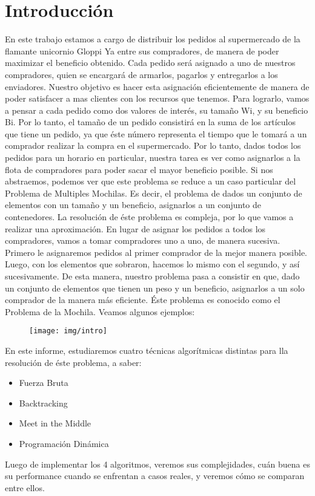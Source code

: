\section{Introducción}
En este trabajo estamos a cargo de distribuir los pedidos al supermercado de la flamante unicornio Gloppi Ya entre sus compradores, de manera de poder maximizar el beneficio obtenido. Cada pedido será asignado a uno de nuestros compradores, quien se encargará de armarlos, pagarlos y entregarlos a los enviadores. Nuestro objetivo es hacer esta asignación eficientemente de manera de poder satisfacer a mas clientes con los recursos que tenemos. Para lograrlo, vamos a pensar a cada pedido como dos valores de interés, su tamaño Wi, y su beneficio Bi. Por lo tanto, el tamaño de un pedido consistirá en la suma de los artículos que tiene un pedido, ya que éste número representa el tiempo que le tomará a un comprador realizar la compra en el supermercado.
Por lo tanto, dados todos los pedidos para un horario en particular, nuestra tarea es ver como asignarlos a la flota de compradores para poder sacar el mayor beneficio posible. Si nos abstraemos, podemos ver que este problema se reduce a un caso particular del Problema de Multiples Mochilas. Es decir, el problema de dados un conjunto de elementos con un tamaño y un beneficio, asignarlos a un conjunto de contenedores. La resolución de éste problema es compleja, por lo que vamos a realizar una aproximación. En lugar de asignar los pedidos a todos los compradores, vamos a tomar compradores uno a uno, de manera sucesiva. Primero le asignaremos pedidos al primer comprador de la mejor manera posible. Luego, con los elementos que sobraron, hacemos lo mismo con el segundo, y así sucesivamente.
De esta manera, nuestro problema pasa a consistir en que, dado un conjunto de elementos que tienen un peso y un beneficio, asignarlos a un solo comprador de la manera más eficiente. Éste problema es conocido como el Problema de la Mochila. 
Veamos algunos ejemplos:

\begin{figure}[H]
     \centering
     \texttt{[image: img/intro]}
\end{figure}

En este informe, estudiaremos cuatro técnicas algorítmicas distintas para lla resolución de éste problema, a saber:
\begin{itemize}
\item Fuerza Bruta
\item Backtracking
\item Meet in the Middle
\item Programación Dinámica
\end{itemize}

Luego de implementar los 4 algoritmos, veremos sus complejidades, cuán buena es su performance cuando se enfrentan a casos reales, y veremos cómo se comparan entre ellos.
\label{sec:introduccion}
